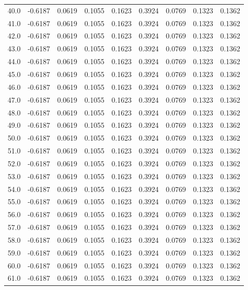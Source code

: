 \begin{longtable}{lrrrrrrrr}
40.0 & -0.6187 & 0.0619 & 0.1055 & 0.1623 & 0.3924 & 0.0769 & 0.1323 & 0.1362 \\
41.0 & -0.6187 & 0.0619 & 0.1055 & 0.1623 & 0.3924 & 0.0769 & 0.1323 & 0.1362 \\
42.0 & -0.6187 & 0.0619 & 0.1055 & 0.1623 & 0.3924 & 0.0769 & 0.1323 & 0.1362 \\
43.0 & -0.6187 & 0.0619 & 0.1055 & 0.1623 & 0.3924 & 0.0769 & 0.1323 & 0.1362 \\
44.0 & -0.6187 & 0.0619 & 0.1055 & 0.1623 & 0.3924 & 0.0769 & 0.1323 & 0.1362 \\
45.0 & -0.6187 & 0.0619 & 0.1055 & 0.1623 & 0.3924 & 0.0769 & 0.1323 & 0.1362 \\
46.0 & -0.6187 & 0.0619 & 0.1055 & 0.1623 & 0.3924 & 0.0769 & 0.1323 & 0.1362 \\
47.0 & -0.6187 & 0.0619 & 0.1055 & 0.1623 & 0.3924 & 0.0769 & 0.1323 & 0.1362 \\
48.0 & -0.6187 & 0.0619 & 0.1055 & 0.1623 & 0.3924 & 0.0769 & 0.1323 & 0.1362 \\
49.0 & -0.6187 & 0.0619 & 0.1055 & 0.1623 & 0.3924 & 0.0769 & 0.1323 & 0.1362 \\
50.0 & -0.6187 & 0.0619 & 0.1055 & 0.1623 & 0.3924 & 0.0769 & 0.1323 & 0.1362 \\
51.0 & -0.6187 & 0.0619 & 0.1055 & 0.1623 & 0.3924 & 0.0769 & 0.1323 & 0.1362 \\
52.0 & -0.6187 & 0.0619 & 0.1055 & 0.1623 & 0.3924 & 0.0769 & 0.1323 & 0.1362 \\
53.0 & -0.6187 & 0.0619 & 0.1055 & 0.1623 & 0.3924 & 0.0769 & 0.1323 & 0.1362 \\
54.0 & -0.6187 & 0.0619 & 0.1055 & 0.1623 & 0.3924 & 0.0769 & 0.1323 & 0.1362 \\
55.0 & -0.6187 & 0.0619 & 0.1055 & 0.1623 & 0.3924 & 0.0769 & 0.1323 & 0.1362 \\
56.0 & -0.6187 & 0.0619 & 0.1055 & 0.1623 & 0.3924 & 0.0769 & 0.1323 & 0.1362 \\
57.0 & -0.6187 & 0.0619 & 0.1055 & 0.1623 & 0.3924 & 0.0769 & 0.1323 & 0.1362 \\
58.0 & -0.6187 & 0.0619 & 0.1055 & 0.1623 & 0.3924 & 0.0769 & 0.1323 & 0.1362 \\
59.0 & -0.6187 & 0.0619 & 0.1055 & 0.1623 & 0.3924 & 0.0769 & 0.1323 & 0.1362 \\
60.0 & -0.6187 & 0.0619 & 0.1055 & 0.1623 & 0.3924 & 0.0769 & 0.1323 & 0.1362 \\
61.0 & -0.6187 & 0.0619 & 0.1055 & 0.1623 & 0.3924 & 0.0769 & 0.1323 & 0.1362 \\

\end{longtable}
